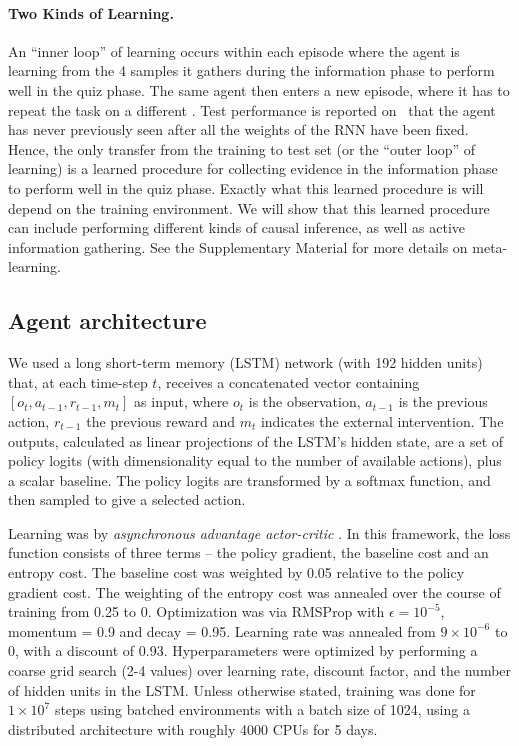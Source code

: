 \paragraph{Two Kinds of Learning.}
An ``inner loop'' of learning occurs within each episode where the agent is learning from the 4 samples it gathers during the information phase to perform well in the quiz phase. The same agent then enters a new episode, where it has to repeat the task on a different \CBN. Test performance is reported on \CBNs~that the agent has never previously seen after all the weights of the RNN have been fixed. Hence, the only transfer from the training to test set (or the ``outer loop'' of learning) is a learned procedure for collecting evidence in the information phase to perform well in the quiz phase. Exactly what this learned procedure is will depend on the training environment. We will show that this learned procedure can include performing different kinds of causal inference, as well as active information gathering. See the Supplementary Material for more details on meta-learning.


\subsection{Agent architecture}

We used a long short-term memory (LSTM) network \citep{hochreiter97long} (with 192 hidden units) that, at each time-step $t$, receives a concatenated vector containing $[o_{t}, a_{t-1}, r_{t-1}, m_{t}]$ as input, where $o_{t}$ is the observation, $a_{t-1}$ is the previous action, $r_{t-1}$ the previous reward and $m_t$ indicates the external intervention. The outputs, calculated as linear projections of the LSTM's hidden state, are a set of policy logits (with dimensionality equal to the number of available actions), plus a scalar baseline. The policy logits are transformed by a softmax function, and then sampled to give a selected action. %

Learning was by \emph{asynchronous advantage actor-critic} \citep{mnih2016}. In this framework, the loss function consists of three terms -- the policy gradient, the baseline cost and an entropy cost. The baseline cost was weighted by 0.05 relative to the policy gradient cost. The weighting of the entropy cost was annealed over the course of training from 0.25 to 0. Optimization was via RMSProp with $\epsilon = 10^{-5}$, momentum = 0.9 and decay = 0.95. Learning rate was annealed from $9\times 10^{-6}$ to 0, with a discount of 0.93. Hyperparameters were optimized by performing a coarse grid search (2-4 values) over learning rate, discount factor, and the number of hidden units in the LSTM. Unless otherwise stated, training was done for $1\times10^7$ steps using batched environments with a batch size of 1024, using a distributed architecture with roughly 4000 CPUs for 5 days.

